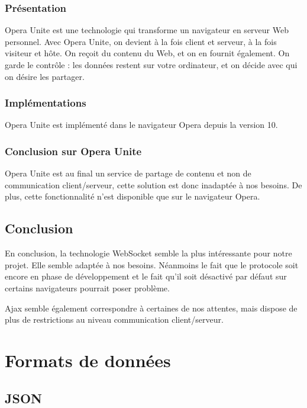 \documentclass[a4paper,10pt]{report}
\begin{document}
    \subsection{Présentation}

Opera Unite est une technologie qui transforme un navigateur en serveur 
Web personnel. Avec Opera Unite, on devient à la fois client et serveur, 
à la fois visiteur et hôte. On reçoit du contenu du Web, et on en fournit 
également. On garde le contrôle : les données restent sur votre ordinateur, 
et on décide avec qui on désire les partager. 

    \subsection{Implémentations}

Opera Unite est implémenté dans le navigateur Opera depuis la version 10.


    \subsection{Conclusion sur Opera Unite}

Opera Unite est au final un service de partage de contenu et non de 
communication client/serveur, cette solution est donc inadaptée à nos 
besoins. De plus, cette fonctionnalité n'est disponible que sur le 
navigateur Opera.

  \section{Conclusion}

En conclusion, la technologie WebSocket semble la plus intéressante pour notre projet.
Elle semble adaptée à nos besoins. Néanmoins le fait que le protocole soit 
encore en phase de développement et le fait qu'il soit désactivé par défaut 
sur certains navigateurs pourrait poser problème.

Ajax semble également correspondre à certaines de nos attentes, mais dispose de plus
de restrictions au niveau communication client/serveur.


\chapter{Formats de données}

  \section{JSON}
\end{document}
